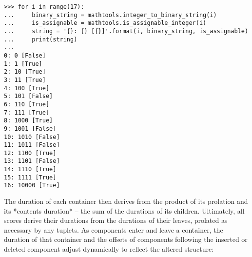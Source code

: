 \begin{comment}
<abjad>
for i in range(17):
    binary_string = mathtools.integer_to_binary_string(i)
    is_assignable = mathtools.is_assignable_integer(i)
    string = '{}: {} [{}]'.format(i, binary_string, is_assignable)
    print(string)

</abjad>
\end{comment}

\begin{abjadbookoutput}
\begin{singlespacing}
\vspace{-0.5\baselineskip}
\begin{verbatim}
>>> for i in range(17):
...     binary_string = mathtools.integer_to_binary_string(i)
...     is_assignable = mathtools.is_assignable_integer(i)
...     string = '{}: {} [{}]'.format(i, binary_string, is_assignable)
...     print(string)
...
0: 0 [False]
1: 1 [True]
2: 10 [True]
3: 11 [True]
4: 100 [True]
5: 101 [False]
6: 110 [True]
7: 111 [True]
8: 1000 [True]
9: 1001 [False]
10: 1010 [False]
11: 1011 [False]
12: 1100 [True]
13: 1101 [False]
14: 1110 [True]
15: 1111 [True]
16: 10000 [True]
\end{verbatim}
\end{singlespacing}
\end{abjadbookoutput}

\noindent The duration of each container then derives from the product of its
prolation and its *contents duration* -- the sum of the durations of its
children. Ultimately, all scores derive their durations from the durations of
their leaves, prolated as necessary by any tuplets. As components enter and
leave a container, the duration of that container and the offsets of components
following the inserted or deleted component adjust dynamically to reflect the
altered structure:

\begin{comment}
<abjad>
staff = Staff("c'4 d'4 e'4 f'4")
show(staff)
inspect_(staff).get_duration()
for leaf in staff:
    offset = inspect_(leaf).get_timespan().start_offset
    print(offset, leaf)

</abjad>
\end{comment}

